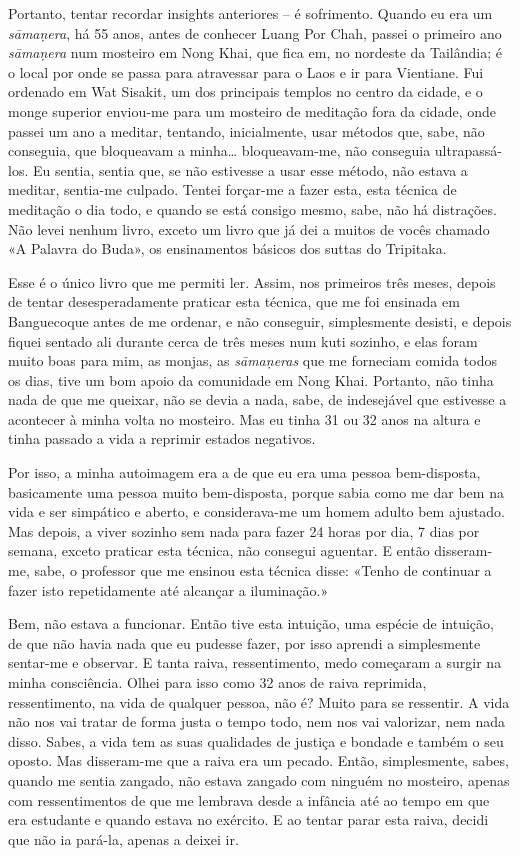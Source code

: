 Portanto, tentar recordar insights anteriores -- é sofrimento. Quando eu era um
\emph{sāmaṇera}, há 55 anos, antes de conhecer Luang Por Chah, passei o primeiro ano
\emph{sāmaṇera} num mosteiro em Nong Khai, que fica em, no nordeste da Tailândia;
é o local por onde se passa para atravessar para o Laos e ir para Vientiane. Fui
ordenado em Wat Sisakit, um dos principais templos no centro da cidade, e o
monge superior enviou-me para um mosteiro de meditação fora da cidade, onde
passei um ano a meditar, tentando, inicialmente, usar métodos que, sabe, não
conseguia, que bloqueavam a minha\ldots{} bloqueavam-me, não conseguia
ultrapassá-los. Eu sentia, sentia que, se não estivesse a usar esse método, não
estava a meditar, sentia-me culpado. Tentei forçar-me a fazer esta, esta
técnica de meditação o dia todo, e quando se está consigo mesmo, sabe, não há
distrações. Não levei nenhum livro, exceto um livro que já dei a muitos de vocês
chamado «A Palavra do Buda», os ensinamentos básicos dos suttas do Tripitaka.

Esse é o único livro que me permiti ler. Assim, nos primeiros três meses, depois
de tentar desesperadamente praticar esta técnica, que me foi ensinada em
Banguecoque antes de me ordenar, e não conseguir, simplesmente desisti, e depois
fiquei sentado ali durante cerca de três meses num kuti sozinho, e elas foram
muito boas para mim, as monjas, as \emph{sāmaṇeras} que me forneciam comida todos os
dias, tive um bom apoio da comunidade em Nong Khai. Portanto, não tinha nada de
que me queixar, não se devia a nada, sabe, de indesejável que estivesse a
acontecer à minha volta no mosteiro. Mas eu tinha 31 ou 32 anos na altura e
tinha passado a vida a reprimir estados negativos.

Por isso, a minha autoimagem era a de que eu era uma pessoa bem-disposta,
basicamente uma pessoa muito bem-disposta, porque sabia como me dar bem na vida
e ser simpático e aberto, e considerava-me um homem adulto bem ajustado. Mas
depois, a viver sozinho sem nada para fazer 24 horas por dia, 7 dias por semana,
exceto praticar esta técnica, não consegui aguentar. E então disseram-me, sabe,
o professor que me ensinou esta técnica disse: «Tenho de continuar a fazer isto
repetidamente até alcançar a iluminação.»

Bem, não estava a funcionar. Então tive esta intuição, uma espécie de intuição,
de que não havia nada que eu pudesse fazer, por isso aprendi a simplesmente
sentar-me e observar. E tanta raiva, ressentimento, medo começaram a surgir na
minha consciência. Olhei para isso como 32 anos de raiva reprimida,
ressentimento, na vida de qualquer pessoa, não é? Muito para se ressentir. A
vida não nos vai tratar de forma justa o tempo todo, nem nos vai valorizar, nem
nada disso. Sabes, a vida tem as suas qualidades de justiça e bondade e também o
seu oposto. Mas disseram-me que a raiva era um pecado. Então, simplesmente,
sabes, quando me sentia zangado, não estava zangado com ninguém no mosteiro,
apenas com ressentimentos de que me lembrava desde a infância até ao tempo em
que era estudante e quando estava no exército. E ao tentar parar esta raiva,
decidi que não ia pará-la, apenas a deixei ir.

